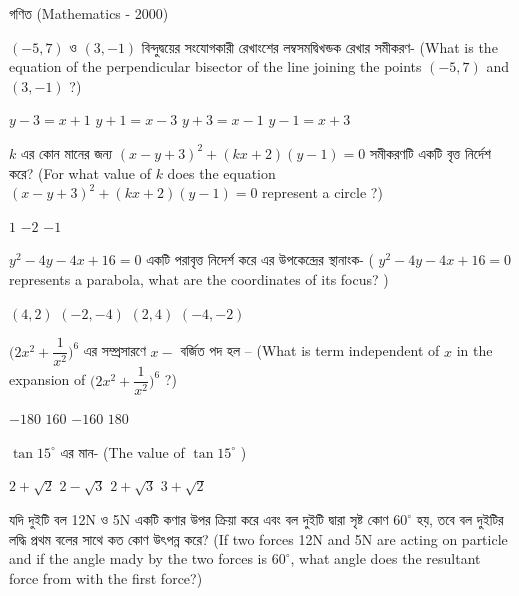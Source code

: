 \documentclass[addpoints]{exam}
\begin{document}
\begin{LARGE}
\begin{center}
গণিত (Mathematics - 2000)
\end{center}
\end{LARGE}
\begin{questions}

\question $ (-5,7) $ ও $ (3,-1) $  বিন্দুদ্বয়ের সংযোগকারী রেখাংশের লম্বসমদ্বিখন্ডক রেখার সমীকরণ- (What is the equation of the perpendicular bisector of the line joining the points $ (-5,7) $ and $ (3,-1) $ ?)  

\begin{oneparchoices}
\choice $ y-3 = x+1 $
\choice $ y+1 = x-3 $
\choice $ y+3= x-1 $
\choice $ y-1 = x+3 $
\end{oneparchoices}

\question  $ k $ এর কোন মানের জন্য $ (x-y+3)^{2}+(kx+2)(y-1)=0 $ সমীকরণটি একটি বৃত্ত নির্দেশ করে? (For what value of $ k $ does the equation $ (x-y+3)^{2}+(kx+2)(y-1)=0 $ represent a circle ?)

\begin{oneparchoices}
\choice  $ 1 $
\choice  $ -2 $
\choice  $ -1 $
\end{oneparchoices}

\question $ y^{2}-4y-4x+16=0 $ একটি পরাবৃত্ত নিদের্শ করে এর উপকেন্দ্রের স্থানাংক- ( $ y^{2}-4y-4x+16=0 $ represents a parabola, what are the coordinates of its focus? )

\begin{oneparchoices}
\choice $ (4,2) $
\choice $ (-2,-4) $
\choice $ (2,4) $
\choice $ (-4,-2) $
\end{oneparchoices}

\question $ \Bigg(2x^{2} + \dfrac{1}{x^{2}} \Bigg)^{6} $ এর সম্প্রসারণে $ x- $ বর্জিত পদ হল – (What is term independent of $ x $ in the expansion of $ \Bigg(2x^{2} + \dfrac{1}{x^{2}} \Bigg)^{6} $ ?)

\begin{oneparchoices}
\choice $ -180 $
\choice $ 160 $
\choice $ -160 $
\choice  $ 180 $
\end{oneparchoices}

\question $ \tan 15^{\circ} $ এর মান- (The value of $ \tan 15^{\circ} $ )

\begin{oneparchoices}
\choice $ 2+\sqrt{2} $
\choice  $ 2-\sqrt{3} $
\choice $ 2+\sqrt{3} $
\choice $ 3+\sqrt{2} $  
\end{oneparchoices}

\question  যদি দুইটি বল 12N ও 5N একটি কণার উপর ক্রিয়া করে এবং বল দুইটি দ্বারা সৃষ্ট কোণ $ 60^{\circ} $ হয়, তবে বল দুইটির লদ্ধি প্রথম বলের সাথে কত কোণ উৎপন্ন করে? (If two forces 12N and 5N are acting on particle and if the angle mady by the two forces is $ 60^{\circ} $, what angle does the resultant force from with the first force?)


\end{questions}
\end{document}
